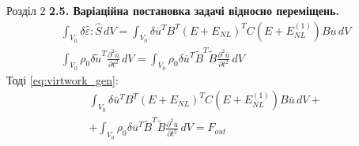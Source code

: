 \documentclass[8pt]{beamer}
\numberwithin{figure}{section}
\numberwithin{equation}{section}
\begin{document}
\begin{frame}{Розділ 2}
\textbf{2.5. Варіаційна постановка задачі відносно переміщень.}
\begin{align}
\int_{V_0} \delta\hat{\varepsilon}:\hat{S}\,dV=\int_{V_0} \delta\overline{u} ^T B ^T\left( E + E_{NL} \right)^T C \left( E + E_{NL}^{(1)} \right)B \overline{u} \, dV\\ \int_{V_0} \rho_0 \delta\tilde{u} ^T \frac{\partial^2 \tilde{u}}{\partial t ^2}\,dV=\int_{V_0} \rho_0 \delta\overline{u} ^T \tilde{B}^T \tilde{B}\frac{\partial^2 \overline{u}}{\partial t ^2}\,dV
\end{align}
Тоді \eqref{eq:virtwork_gen}:
\begin{multline}
\int_{V_0} \delta\overline{u} ^T B ^T\left( E + E_{NL} \right)^T C \left( E + E_{NL}^{(1)} \right)B \overline{u} \, dV+\\+\int_{V_0} \rho_0 \delta\overline{u} ^T \tilde{B}^T \tilde{B}\frac{\partial^2 \overline{u}}{\partial t ^2}\,dV=F_{out}
\end{multline}

\end{frame}
\end{document}

